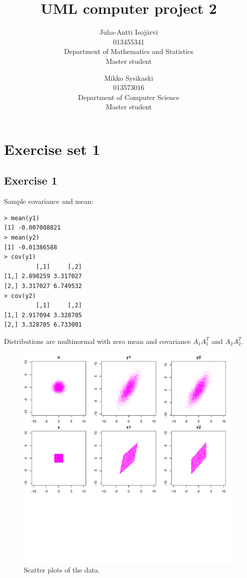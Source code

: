 \documentclass{article}
\begin{document}
\title{UML computer project 2}
\author{
Juha-Antti Isojärvi\\
013455341 \\
Department of Mathematics and Statistics\\
Master student
\and
Mikko Sysikaski\\
013573016\\
Department of Computer Science\\
Master student}
\date{}
\maketitle

\section{Exercise set 1}
\subsection{Exercise 1}
Sample covariance and mean:
\begin{verbatim}
> mean(y1)
[1] -0.007008821
> mean(y2)
[1] -0.01386588
> cov(y1)
         [,1]     [,2]
[1,] 2.898259 3.317027
[2,] 3.317027 6.749532
> cov(y2)
         [,1]     [,2]
[1,] 2.917094 3.328705
[2,] 3.328705 6.733001
\end{verbatim}
Distributions are multinormal with zero mean and covariance $A_1A_1^T$
and $A_2A_2^T$. 

\begin{figure}\centering
	\includegraphics{scatterPlotE21.pdf}
	\caption{Scatter plots of the data.} \label{fig:scatterE21}
\end{figure}
\end{document}
